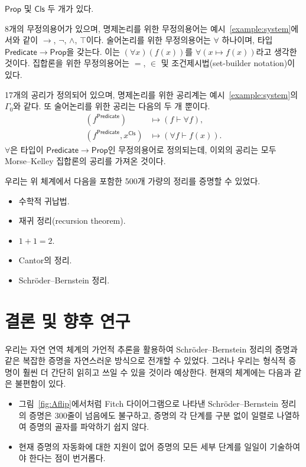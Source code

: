 \documentclass[10pt,twocolumn]{article}
\theoremstyle{definition}
\newcommand{\Prop}{\mathsf{Prop}}
\newcommand{\Cls}{\mathsf{Cls}}
\newcommand{\Predicate}{\mathsf{Predicate}}
\begin{document}
\begin{description}[leftmargin=0cm]
	\item[원시 타입.] $\Prop$ 및 $\Cls$ 두 개가 있다.
	\item[무정의용어.] 8개의 무정의용어가 있으며, 명제논리를 위한 무정의용어는 예시~\ref{example:system}에서와 같이 $\to$, $\neg$, $\land$, $\top$이다. 술어논리를 위한 무정의용어는 $\forall$ 하나이며, 타입 $\Predicate\to\Prop$을 갖는다. 이는 $(\forall x)(f(x))$를 $\forall(x\mapsto f(x))$라고 생각한 것이다. 집합론을 위한 무정의용어는 $=$, $\in$ 및 조건제시법(set-builder notation)이 있다.
	\item[공리계.] 17개의 공리가 정의되어 있으며, 명제논리를 위한 공리계는 예시~\ref{example:system}의 $\Gamma_0$와 같다. 또 술어논리를 위한 공리는 다음의 두 개 뿐이다.
	\begin{align*}
		(f^\Predicate)&\mapsto (f\vdash\forall f), \\
		(f^\Predicate, x^\Cls)&\mapsto (\forall f\vdash f(x)).
	\end{align*}
	$\forall$은 타입이 $\Predicate\to\Prop$인 무정의용어로 정의되는데,  이외의 공리는 모두 Morse--Kelley 집합론의 공리를 가져온 것이다.
\end{description}

우리는 위 체계에서 다음을 포함한 500개 가량의 정리를 증명할 수 있었다.

\begin{itemize}
	\item 수학적 귀납법.
	\item 재귀 정리(recursion theorem).
	\item $1+1=2$.
	\item Cantor의 정리.
	\item Schr\"oder--Bernstein 정리.
\end{itemize}

\section{결론 및 향후 연구}

우리는 자연 연역 체계의 가언적 추론을 활용하여 Schr\"oder--Bernstein 정리의 증명과 같은 복잡한 증명을 자연스러운 방식으로 전개할 수 있었다. 그러나 우리는 형식적 증명이 훨씬 더 간단히 읽히고 쓰일 수 있을 것이라 예상한다. 현재의 체계에는 다음과 같은 불편함이 있다.

\begin{itemize}
	\item 그림~\ref{fig:Aflip}에서처럼 Fitch 다이어그램으로 나타낸 Schr\"oder--Bernstein 정리의 증명은 300줄이 넘음에도 불구하고, 증명의 각 단계를 구분 없이 일렬로 나열하여 증명의 골자를 파악하기 쉽지 않다.
	\item 현재 증명의 자동화에 대한 지원이 없어 증명의 모든 세부 단계를 일일이 기술하여야 한다는 점이 번거롭다.
\end{itemize}
\end{document}
